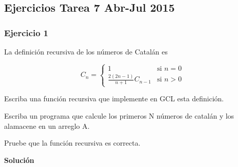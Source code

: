 \documentclass[hidelinks]{article}
\begin{document}
\newpage

\subsection{Ejercicios Tarea 7 Abr-Jul 2015}

\subsubsection{Ejercicio 1}

La definición recursiva de los números de Catalán es

\begin{equation}
	C_n =
	\begin{cases}
		1                              & \text{si } n = 0 \\
		\frac{2(2n - 1)}{n + 1}C_{n-1} & \text{si } n > 0
	\end{cases}
\end{equation} \par

Escriba una función recursiva que implemente en GCL esta definición.\par
Escriba un programa que calcule los primeros N números de catalán y los
alamacene en un arreglo A.\par
Pruebe que la función recursiva es correcta.\par

\textbf{Solución}\par
\end{document}
